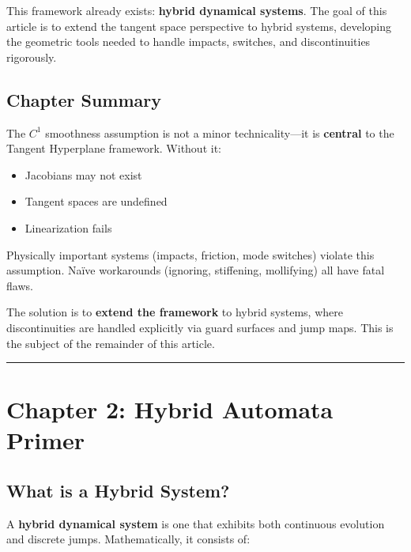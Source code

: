 \documentclass[
  letterpaper,
  DIV=11,
  numbers=noendperiod]{scrartcl}
\providecommand{\tightlist}{%
  \setlength{\itemsep}{0pt}\setlength{\parskip}{0pt}}\usepackage{longtable,booktabs,array}
\begin{document}
This framework already exists: \textbf{hybrid dynamical systems}. The
goal of this article is to extend the tangent space perspective to
hybrid systems, developing the geometric tools needed to handle impacts,
switches, and discontinuities rigorously.

\subsection{Chapter Summary}\label{chapter-summary}

The \(C^1\) smoothness assumption is not a minor technicality---it is
\textbf{central} to the Tangent Hyperplane framework. Without it:

\begin{itemize}
\tightlist
\item
  Jacobians may not exist
\item
  Tangent spaces are undefined
\item
  Linearization fails
\end{itemize}

Physically important systems (impacts, friction, mode switches) violate
this assumption. Naïve workarounds (ignoring, stiffening, mollifying)
all have fatal flaws.

The solution is to \textbf{extend the framework} to hybrid systems,
where discontinuities are handled explicitly via guard surfaces and jump
maps. This is the subject of the remainder of this article.

\begin{center}\rule{0.5\linewidth}{0.5pt}\end{center}

\section{Chapter 2: Hybrid Automata Primer}\label{sec-hybrid-automata}

\subsection{What is a Hybrid System?}\label{what-is-a-hybrid-system}

A \textbf{hybrid dynamical system} is one that exhibits both continuous
evolution and discrete jumps. Mathematically, it consists of:
\end{document}
